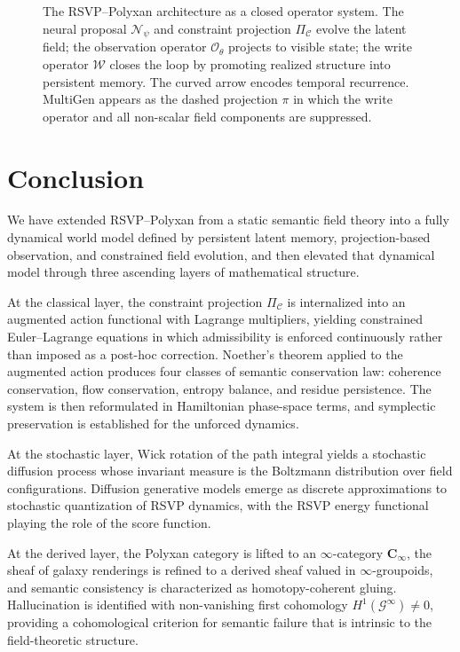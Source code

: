 \documentclass[11pt]{article}
\begin{document}
\begin{figure}[h]
\begin{tikzpicture}[scale=1.05, every node/.style={font=\small}]
\end{tikzpicture}
\caption{The RSVP--Polyxan architecture as a closed operator system.
The neural proposal $\mathcal{N}_\psi$ and constraint projection
$\Pi_{\mathcal{C}}$ evolve the latent field; the observation operator
$\mathcal{O}_\theta$ projects to visible state; the write operator
$\mathcal{W}$ closes the loop by promoting realized structure into
persistent memory.
The curved arrow encodes temporal recurrence.
MultiGen appears as the dashed projection $\pi$ in which the write
operator and all non-scalar field components are suppressed.}
\end{figure}

\newpage
\section{Conclusion}

We have extended RSVP--Polyxan from a static semantic field theory into a
fully dynamical world model defined by persistent latent memory,
projection-based observation, and constrained field evolution, and then
elevated that dynamical model through three ascending layers of mathematical
structure.

At the classical layer, the constraint projection $\Pi_{\mathcal{C}}$ is
internalized into an augmented action functional with Lagrange multipliers,
yielding constrained Euler--Lagrange equations in which admissibility is
enforced continuously rather than imposed as a post-hoc correction.
Noether's theorem applied to the augmented action produces four classes of
semantic conservation law: coherence conservation, flow conservation,
entropy balance, and residue persistence.
The system is then reformulated in Hamiltonian phase-space terms, and
symplectic preservation is established for the unforced dynamics.

At the stochastic layer, Wick rotation of the path integral yields a
stochastic diffusion process whose invariant measure is the Boltzmann
distribution over field configurations.
Diffusion generative models emerge as discrete approximations to stochastic
quantization of RSVP dynamics, with the RSVP energy functional playing the
role of the score function.

At the derived layer, the Polyxan category is lifted to an $\infty$-category
$\mathbf{C}_\infty$, the sheaf of galaxy renderings is refined to a derived
sheaf valued in $\infty$-groupoids, and semantic consistency is characterized
as homotopy-coherent gluing.
Hallucination is identified with non-vanishing first cohomology
$H^1(\mathscr{G}^\infty) \neq 0$, providing a cohomological criterion for
semantic failure that is intrinsic to the field-theoretic structure.
\end{document}
